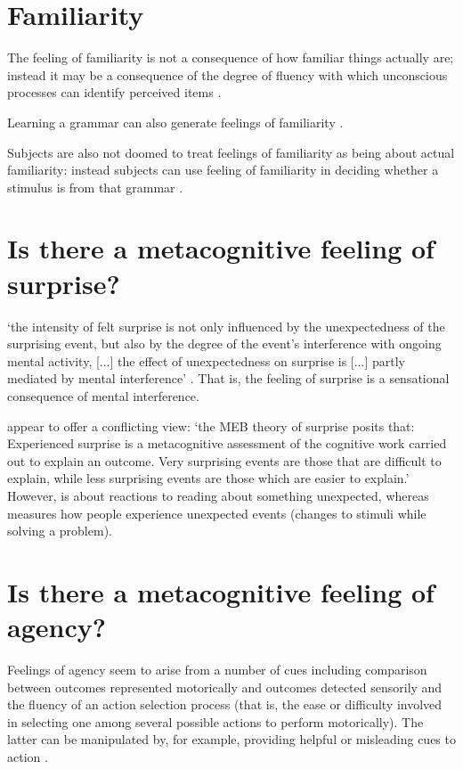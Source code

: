 \documentclass[12pt]{extarticle}
\begin{document}
\begin{multicols*}{3}
\section{Familiarity}

The feeling of familiarity is not a consequence of how familiar things 
actually are; instead it may be a consequence of 
the degree of fluency with which unconscious processes can identify 
perceived items \citep{Whittlesea:1993xk,Whittlesea:1998qj}.

Learning a grammar can also generate feelings of familiarity \citep{scott:2008_familiarity}.

Subjects are also not doomed to treat feelings of familiarity as being
about actual familiarity:
instead subjects can use feeling of 
familiarity in deciding whether a stimulus is from that grammar 
\citep{Wan:2008_familiarity}.

\section{Is there a metacognitive feeling of surprise?}

‘the intensity of felt surprise is not only influenced by the unexpectedness of the surprising event, but also by the degree of the event’s interference with ongoing mental activity, [...]
the effect of unexpectedness on surprise is [...] partly mediated by mental interference’
\citep[p.~271]{reisenzein2000subjective}.
That is, the feeling of surprise is a sensational consequence of mental interference.

\citet[p.~79]{foster:2015_whya} appear to offer a conflicting view:
‘the MEB theory of surprise posits that: Experienced surprise is a metacognitive assessment
of the cognitive work carried out to explain an outcome. Very surprising events are those
that are difficult to explain, while less surprising events are those which are easier to
explain.’
However, \citet{foster:2015_whya} is about reactions to reading about something unexpected, whereas
\citet{reisenzein2000subjective} measures how people experience unexpected events (changes to
stimuli while solving a problem).

\section{Is there a metacognitive feeling of agency?}

Feelings of agency seem to arise
from a number of cues including   comparison between outcomes represented motorically and outcomes detected sensorily and  the fluency of an action selection process (that is, the ease or difficulty involved in 
selecting one among several possible actions to perform motorically).
The latter can be manipulated by,
for example, providing helpful or misleading cues to action
\citep{wenke:2010_subliminal,sidarus:2013_priming,sidarus:2017_how}.


\end{multicols*}
\end{document}
